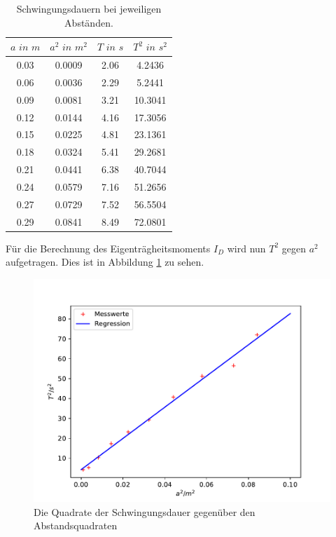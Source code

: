 \documentclass[
  bibliography=totoc,     %
  captions=tableheading,  %
  titlepage=firstiscover, %
]{scrartcl}
\begin{document}
   \begin{table}
     \centering
     \caption{Schwingungsdauern bei jeweiligen Abständen.}
     \label{tab:data2}
     \begin{tabular}{c c c c }
       \toprule $a \, \,  in \,\, m$ & $a^2 \,\, in \,\,  m^2$ & $T \,\, in \,\, s$ & $T^2 \,\, in  \,\, s^2$ \\
       \midrule
       0.03 & 0.0009 & 2.06 &  4.2436\\
       0.06 & 0.0036 & 2.29 &  5.2441\\
       0.09 & 0.0081 & 3.21 &  10.3041\\
       0.12 & 0.0144 & 4.16 &  17.3056\\
       0.15 & 0.0225 & 4.81 &  23.1361\\
       0.18 & 0.0324 & 5.41 &  29.2681\\
       0.21 & 0.0441 & 6.38 &  40.7044\\
       0.24 & 0.0579 & 7.16 &  51.2656\\
       0.27 & 0.0729 & 7.52 &  56.5504\\
       0.29 & 0.0841 & 8.49 &  72.0801\\
       \bottomrule
     \end{tabular}
   \end{table}
 Für die Berechnung des Eigenträgheitsmoments $I_D$ wird nun $T^2$ gegen $a^2$ aufgetragen.
 Dies ist in Abbildung \ref{fig:2} zu sehen.

   \begin{figure}
     \centering
     \includegraphics[width=\textwidth]{plot1.pdf}
     \caption{Die Quadrate der Schwingungsdauer gegenüber den Abstandsquadraten}
     \label{fig:2}
   \end{figure}
\end{document}
